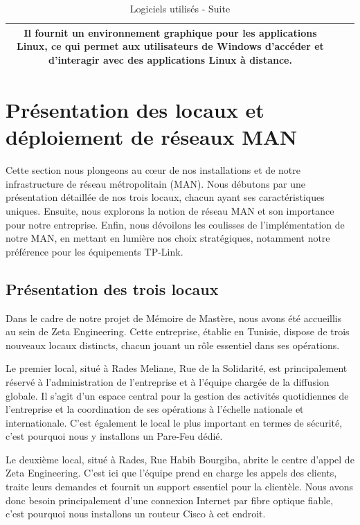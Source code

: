 \begin{table}[H]
\begin{center}
\begin{tabular}{|c{3cm}|c{3cm}|l{10cm}|}
Il fournit un environnement graphique pour les applications Linux, ce qui permet aux utilisateurs de Windows d'accéder et d'interagir avec des applications Linux à distance. \\
\hline
\end{tabular}
\caption{Logiciels utilisés - Suite}
\label{3}
\end{center}
\end{table}


\section{Présentation des locaux et déploiement de réseaux MAN}

Cette section nous plongeons au cœur de nos installations et de notre infrastructure de réseau métropolitain (MAN). Nous débutons par une présentation détaillée de nos trois locaux, chacun ayant ses caractéristiques uniques. Ensuite, nous explorons la notion de réseau MAN et son importance pour notre entreprise. Enfin, nous dévoilons les coulisses de l'implémentation de notre MAN, en mettant en lumière nos choix stratégiques, notamment notre préférence pour les équipements TP-Link.




\subsection{Présentation des trois locaux}

Dans le cadre de notre projet de Mémoire de Mastère, nous avons été accueillis au sein de Zeta Engineering. Cette entreprise, établie en Tunisie, dispose de trois nouveaux locaux distincts, chacun jouant un rôle essentiel dans ses opérations.

Le premier local, situé à Rades Meliane, Rue de la Solidarité, est principalement réservé à l'administration de l'entreprise et à l'équipe chargée de la diffusion globale. Il s'agit d'un espace central pour la gestion des activités quotidiennes de l'entreprise et la coordination de ses opérations à l'échelle nationale et internationale. C'est également le local le plus important en termes de sécurité, c'est pourquoi nous y installons un Pare-Feu dédié. 

Le deuxième local, situé à Rades, Rue Habib Bourgiba, abrite le centre d'appel de Zeta Engineering. C'est ici que l'équipe prend en charge les appels des clients, traite leurs demandes et fournit un support essentiel pour la clientèle. Nous avons donc besoin principalement d'une connexion Internet par fibre optique fiable, c'est pourquoi nous installons un routeur Cisco à cet endroit.

